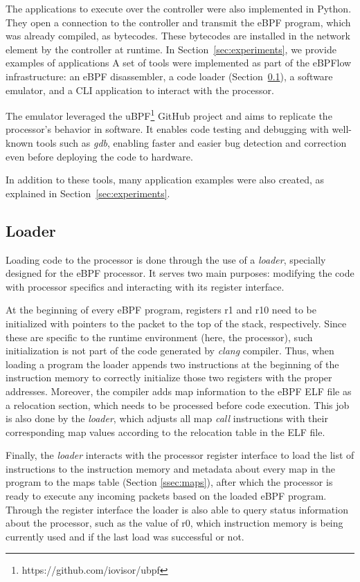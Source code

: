 The applications to execute over the controller were also implemented in Python.
They open a connection to the controller and transmit the eBPF program, which was already compiled, as bytecodes.
These bytecodes are installed in the network element by the controller at runtime.
In Section~\ref{sec:experiments}, we provide examples of applications
\color{black}
\color{blue}
A set of tools were implemented as part of the eBPFlow infrastructure: an eBPF disassembler, a code loader (Section~\ref{ssec:loader}), a software emulator, and a CLI application to interact with the processor.

The emulator leveraged the uBPF\footnote{https://github.com/iovisor/ubpf} GitHub project and aims to replicate the processor's behavior in software. It enables code testing and debugging with well-known tools such as \textit{gdb}, enabling faster and easier bug detection and correction even before deploying the code to hardware.

In addition to these tools, many application examples were also created, as explained in Section~\ref{sec:experiments}.

\subsection{Loader}
\label{ssec:loader}
Loading code to the processor is done through the use of a \textit{loader}, specially designed for the eBPF processor. It serves two main purposes: modifying the code with processor specifics and interacting with its register interface.

At the beginning of every eBPF program, registers r1 and r10 need to be initialized with pointers to the packet to the top of the stack, respectively. Since these are specific to the runtime environment (here, the processor), such initialization is not part of the code generated by \textit{clang} compiler. Thus, when loading a program the loader appends two instructions at the beginning of the instruction memory to correctly initialize those two registers with the proper addresses. Moreover, the compiler adds map information to the eBPF ELF file as a relocation section, which needs to be processed before code execution. This job is also done by the \textit{loader}, which adjusts all map \textit{call} instructions with their corresponding map values according to the relocation table in the ELF file.

Finally, the \textit{loader} interacts with the processor register interface to load the list of instructions to the instruction memory and metadata about every map in the program to the maps table (Section \ref{ssec:maps}), after which the processor is ready to execute any incoming packets based on the loaded eBPF program. Through the register interface the loader is also able to query status information about the processor, such as the value of r0, which instruction memory is being currently used and if the last load was successful or not.

\color{black}